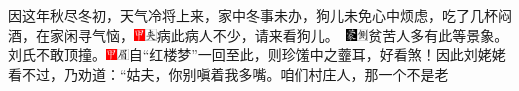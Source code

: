 因这年秋尽冬初，天气冷将上来，家中冬事未办，狗儿未免心中烦虑，吃了几杯闷酒，在家闲寻气恼，{{\includegraphics[width=3mm]{../Images/00002}\includegraphics[width=3mm]{../Images/00012}\footnotesize \kaishu 病此病人不少，请来看狗儿。　}\includegraphics[width=3mm]{../Images/00006}\includegraphics[width=3mm]{../Images/00011}\footnotesize \kaishu 贫苦人多有此等景象。}刘氏不敢顶撞。{\includegraphics[width=3mm]{../Images/00002}\includegraphics[width=3mm]{../Images/00010}\footnotesize \kaishu 自``红楼梦''一回至此，则珍馐中之虀耳，好看煞！}因此刘姥姥看不过，乃劝道：``姑夫，你别嗔着我多嘴。咱们村庄人，那一个不是老